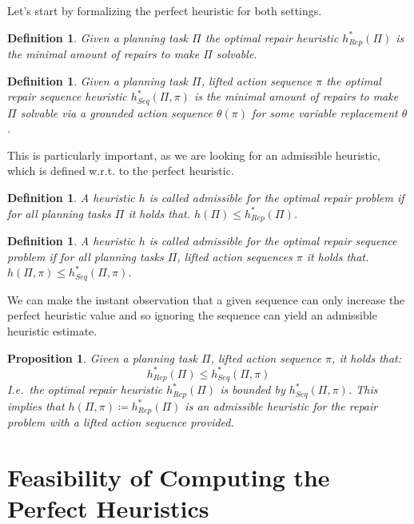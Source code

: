 \documentclass[twocolumn]{article}
\newcommand{\task}{\ensuremath{\Pi}\xspace}
\newcommand{\varRepl}{\ensuremath{\theta}\xspace}
\newcommand{\someActSeq}{\ensuremath{\pi}\xspace}
\newcommand{\optimalHeuristic}{\ensuremath{h^{*}_{Rep}}\xspace}
\newcommand{\optimalHeuristicSeq}{\ensuremath{h^{*}_{Seq}}\xspace}
\newtheorem{proposition}[theorem]{Proposition}
\newtheorem{definition}[theorem]{Definition}
\begin{document}
	Let's start by formalizing the perfect heuristic for both settings.
	
	\begin{definition}
		Given a planning task \task the optimal repair heuristic $\optimalHeuristic(\task)$ is the minimal amount of repairs to make \task solvable.
	\end{definition}
	
	\begin{definition}
		Given a planning task \task, lifted action sequence \someActSeq the optimal repair sequence heuristic $\optimalHeuristicSeq(\task, \someActSeq)$ is the minimal amount of repairs to make \task solvable via a grounded action sequence $\varRepl(\someActSeq)$ for some variable replacement \varRepl.
	\end{definition}
	
	This is particularly important, as we are looking for an admissible heuristic, which is defined w.r.t. to the perfect heuristic.
	
	\begin{definition}
		A heuristic $h$ is called admissible for the optimal repair problem if for all planning tasks \task it holds that. $h(\task) \leq \optimalHeuristic(\task)$. 
	\end{definition}
	
	\begin{definition}
		A heuristic $h$ is called admissible for the optimal repair sequence problem if for all planning tasks \task, lifted action sequences \someActSeq it holds that. $h(\task, \someActSeq) \leq \optimalHeuristicSeq(\task, \someActSeq)$. 
	\end{definition}
	
	We can make the instant observation that a given sequence can only increase the perfect heuristic value and so ignoring the sequence can yield an admissible heuristic estimate.
	
	\begin{proposition}
		Given a planning task \task, lifted action sequence \someActSeq, it holds that:
		$$
		\optimalHeuristic(\task) \leq \optimalHeuristicSeq(\task, \someActSeq)
		$$
		I.e.\ the optimal repair heuristic $\optimalHeuristic(\task)$ is bounded by $\optimalHeuristicSeq(\task, \someActSeq)$.
		This implies that $h(\task, \someActSeq) \coloneqq \optimalHeuristic(\task)$ is an admissible heuristic for the repair problem with a lifted action sequence provided.
	\end{proposition}
	
	\section{Feasibility of Computing the Perfect Heuristics}
	
\end{document}
